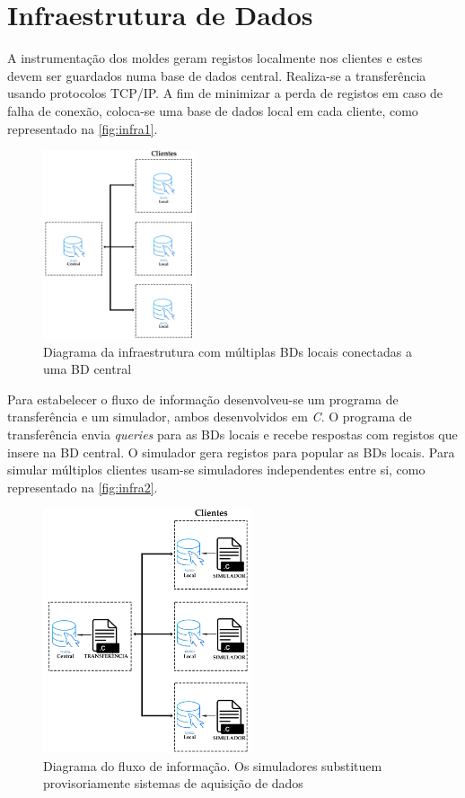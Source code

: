 \documentclass[11pt,twoside,a4paper]{report}
\begin{document}
\section{Infraestrutura de Dados}
A instrumentação dos moldes geram registos localmente nos clientes e estes devem ser guardados numa base de dados central. Realiza-se a transferência usando protocolos TCP/IP. A fim de minimizar a perda de registos em caso de falha de conexão, coloca-se uma base de dados local em cada cliente, como representado na \autoref{fig:infra1}.
\begin{figure}[H]
	\begin{center}
		\includegraphics[width=0.40\textwidth]{Esquema_Projeto_4} %
		\caption[Diagrama das bases de dados]{Diagrama da infraestrutura com múltiplas BDs locais conectadas a uma BD central}
		\label{fig:infra1}
		\end{center}
\end{figure}
Para estabelecer o fluxo de informação desenvolveu-se um programa de transferência e um simulador, ambos desenvolvidos em \textit{C}. O programa de transferência envia \textit{queries} para as BDs locais e recebe respostas com registos que insere na BD central. O simulador gera registos para popular as BDs locais. Para simular múltiplos clientes usam-se simuladores independentes entre si, como representado na \autoref{fig:infra2}.
\begin{figure}[H]
	\begin{center}
		\includegraphics[width=0.55\textwidth]{Esquema_Projeto_5} %
		\caption[Diagrama do fluxo de informação]{Diagrama do fluxo de informação. Os simuladores substituem provisoriamente sistemas de aquisição de dados}
		\label{fig:infra2}
		\end{center}
\end{figure}
\end{document}
